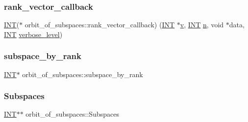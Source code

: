 \mbox{\label{classorbit__of__subspaces_af2987eb2d580b251c23c9ffe72addf21}} 
\subsubsection{\texorpdfstring{rank\+\_\+vector\+\_\+callback}{rank\_vector\_callback}}
{\footnotesize\ttfamily \mbox{\hyperlink{galois_8h_a09fddde158a3a20bd2dcadb609de11dc}{I\+NT}}($\ast$ orbit\+\_\+of\+\_\+subspaces\+::rank\+\_\+vector\+\_\+callback) (\mbox{\hyperlink{galois_8h_a09fddde158a3a20bd2dcadb609de11dc}{I\+NT}} $\ast$\mbox{\hyperlink{simeon_8_c_aeb3f3030944801b163bc3b829a7f6710}{v}}, \mbox{\hyperlink{galois_8h_a09fddde158a3a20bd2dcadb609de11dc}{I\+NT}} \mbox{\hyperlink{classorbit__of__subspaces_a86783a798a9d837bfa689eef4e6554f5}{n}}, void $\ast$data, \mbox{\hyperlink{galois_8h_a09fddde158a3a20bd2dcadb609de11dc}{I\+NT}} \mbox{\hyperlink{simeon_8_c_a818073fbcc2f439e7c56952f67386122}{verbose\+\_\+level}})}

\mbox{\label{classorbit__of__subspaces_a60fa89131497be64964a6f8dc45be329}} 
\subsubsection{\texorpdfstring{subspace\+\_\+by\+\_\+rank}{subspace\_by\_rank}}
{\footnotesize\ttfamily \mbox{\hyperlink{galois_8h_a09fddde158a3a20bd2dcadb609de11dc}{I\+NT}}$\ast$ orbit\+\_\+of\+\_\+subspaces\+::subspace\+\_\+by\+\_\+rank}

\mbox{\label{classorbit__of__subspaces_a9f5e9cbffc7540a68a4ad68614d62d95}} 
\subsubsection{\texorpdfstring{Subspaces}{Subspaces}}
{\footnotesize\ttfamily \mbox{\hyperlink{galois_8h_a09fddde158a3a20bd2dcadb609de11dc}{I\+NT}}$\ast$$\ast$ orbit\+\_\+of\+\_\+subspaces\+::\+Subspaces}

